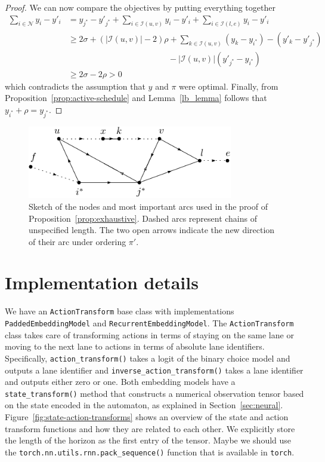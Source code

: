 \documentclass[a4paper]{article}
\theoremstyle{definition}
\theoremstyle{plain}
\begin{document}
\begin{proof}
  We can now compare the objectives by putting everything together
  \begin{align*}
    \sum_{i \in \mathcal{N}} y_{i} - y'_{i} &=  y_{j^{*}} - y'_{j^{*}} + \sum_{i \in \mathcal{I}(u, v)} y_{i} - y'_{i} + \sum_{i \in \mathcal{I}(l, e)} y_{i} - y'_{i} \\
    &\geq 2 \sigma + (|\mathcal{I}(u,v)| - 2) \rho + \sum_{k \in \mathcal{I}(u,v)} (y_{k} - y_{i^{*}}) - (y'_{k} - y'_{j^{*}}) \\ & \hspace{12em} - |\mathcal{I}(u,v)| (y'_{j^{*}} - y_{i^{*}}) \\
    &\geq 2 \sigma - 2 \rho > 0
  \end{align*}
  which contradicts the assumption that $y$ and $\pi$ were optimal.
  Finally, from Proposition~\ref{prop:active-schedule} and Lemma~\ref{lb_lemma}
  follows that $y_{i^{*}} + \rho = y_{j^{*}}$.
\end{proof}

\begin{figure}[H]
  \centering
  \includegraphics[width=0.8\textwidth]{figures/single/platoon-preservation-proof-diagram.pdf}
  \caption{Sketch of the nodes and most important arcs used in the proof of
    Proposition~\ref{prop:exhaustive}. Dashed arcs represent chains of
    unspecified length. The two open arrows indicate the new direction of their
    arc under ordering $\pi'$.}\label{fig:platoon-preservation-diagram}
\end{figure}


\section{Implementation details}

We have an \texttt{ActionTransform} base class with implementations
\texttt{PaddedEmbeddingModel} and \texttt{RecurrentEmbeddingModel}. The
\texttt{ActionTransform} class takes care of transforming actions in terms of
staying on the same lane or moving to the next lane to actions in terms of
absolute lane identifiers. Specifically, \texttt{action\_transform()} takes a
logit of the binary choice model and outputs a lane identifier and
\texttt{inverse\_action\_transform()} takes a lane identifier and outputs either
zero or one.
%
Both embedding models have a \texttt{state\_transform()} method that constructs
a numerical observation tensor based on the state encoded in the automaton, as
explained in Section~\ref{sec:neural}.
%
Figure~\ref{fig:state-action-transforms} shows an overview of the state and action transform functions and how
they are related to each other.
%
We explicitly store the length of the
horizon as the first entry of the tensor. Maybe we should use the
\texttt{torch.nn.utils.rnn.pack\_sequence()} function that is available in
\texttt{torch}.
\end{document}
